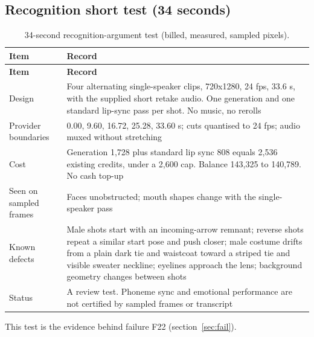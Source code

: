 \documentclass[11pt,a4paper]{article}
\begin{document}
\subsection{Recognition short test (34 seconds)}
\begin{longtable}{@{}P{4.2cm}P{11.3cm}@{}}
\caption{34-second recognition-argument test (billed, measured, sampled pixels).}\\
\toprule \textbf{Item} & \textbf{Record}\\ \midrule\endfirsthead
\toprule \textbf{Item} & \textbf{Record}\\ \midrule\endhead
Design & Four alternating single-speaker clips, 720x1280, 24 fps, 33.6 s, with the supplied short retake audio. One generation and one standard lip-sync pass per shot. No music, no rerolls\\
Provider boundaries & 0.00, 9.60, 16.72, 25.28, 33.60 s; cuts quantised to 24 fps; audio muxed without stretching\\
Cost & Generation 1,728 plus standard lip sync 808 equals 2,536 existing credits, under a 2,600 cap. Balance 143,325 to 140,789. No cash top-up\\
Seen on sampled frames & Faces unobstructed; mouth shapes change with the single-speaker pass\\
Known defects & Male shots start with an incoming-arrow remnant; reverse shots repeat a similar start pose and push closer; male costume drifts from a plain dark tie and waistcoat toward a striped tie and visible sweater neckline; eyelines approach the lens; background geometry changes between shots\\
Status & A review test. Phoneme sync and emotional performance are not certified by sampled frames or transcript\\
\bottomrule
\end{longtable}
This test is the evidence behind failure F22 (section~\ref{sec:fail}).
\end{document}
